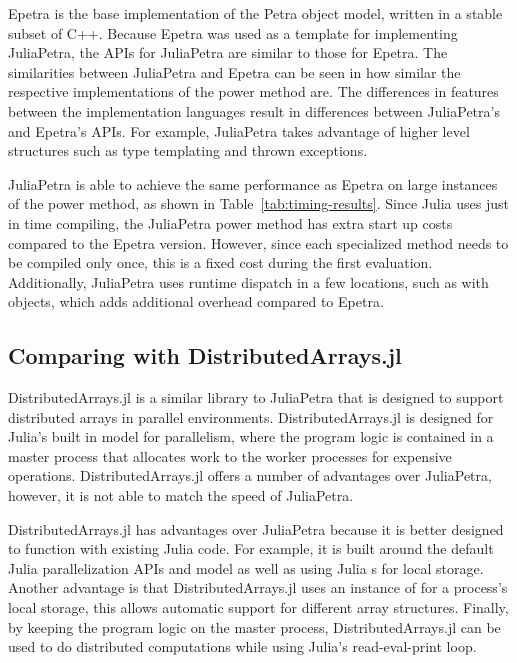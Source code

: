 \documentclass[acmsmall]{acmart}
\newcommand{\juliaSnippet}[1]{\texttt{\detokenize{#1}}}
\begin{document}
Epetra is the base implementation of the Petra object model,
written in a stable subset of C++. \cite{OverviewOfTrilinos}
Because Epetra was used as a template for implementing JuliaPetra,
the APIs for JuliaPetra are similar to those for Epetra.
The similarities between JuliaPetra and Epetra can be seen in how similar the respective implementations
of the power method are.
The differences in features between the implementation languages result in differences
between JuliaPetra's and Epetra's APIs.
For example, JuliaPetra takes advantage of higher level structures
such as type templating and thrown exceptions.

JuliaPetra is able to achieve the same performance as Epetra on large instances of the power method,
as shown in Table~\ref{tab:timing-results}.
Since Julia uses just in time compiling, the JuliaPetra power method has extra start up costs compared to
the Epetra version. However, since each specialized method needs to be compiled only once,
this is a fixed cost during the first evaluation.
Additionally, JuliaPetra uses runtime dispatch in a few locations, such as with
\juliaSnippet{Comm} objects, which adds additional overhead compared to Epetra.

\subsection{Comparing with DistributedArrays.jl}

DistributedArrays.jl is a similar library to JuliaPetra that is designed to support
distributed arrays in parallel environments. \cite{DAGithub}
DistributedArrays.jl is designed for Julia's built in model for parallelism, where the program logic is
contained in a master process that allocates work to the worker processes for expensive operations.
\cite{JuliaFreshApproach}
DistributedArrays.jl offers a number of advantages over JuliaPetra, however, it is not able to
match the speed of JuliaPetra.

DistributedArrays.jl has advantages over JuliaPetra because it is better designed to function with
existing Julia code.
For example, it is built around the default Julia parallelization APIs and model as well as using
Julia \juliaSnippet{AbstractArray}s for local storage.
Another advantage is that DistributedArrays.jl uses an instance of \juliaSnippet{AbstractArray}
for a process's local storage, this allows automatic support for different array structures.
Finally, by keeping the program logic on the master process, DistributedArrays.jl can be used to
do distributed computations while using Julia's read-eval-print loop.
\end{document}
